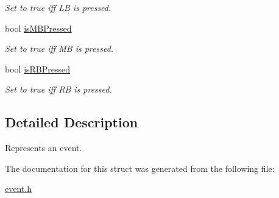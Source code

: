 \begin{DoxyCompactItemize}
\begin{DoxyCompactList}\small\item\em Set to true iff LB is pressed. \end{DoxyCompactList}\item 
bool \mbox{\hyperlink{group__event_ga736bfa60cc90cc6f8e11fb555520545e}{is\+M\+B\+Pressed}}
\begin{DoxyCompactList}\small\item\em Set to true iff MB is pressed. \end{DoxyCompactList}\item 
bool \mbox{\hyperlink{group__event_ga82fc1d867f7a90159e8b05cba5e5ee96}{is\+R\+B\+Pressed}}
\begin{DoxyCompactList}\small\item\em Set to true iff RB is pressed. \end{DoxyCompactList}\end{DoxyCompactItemize}


\subsection{Detailed Description}
Represents an event. 

The documentation for this struct was generated from the following file\+:\begin{DoxyCompactItemize}
\item 
\mbox{\hyperlink{event_8h}{event.\+h}}\end{DoxyCompactItemize}
